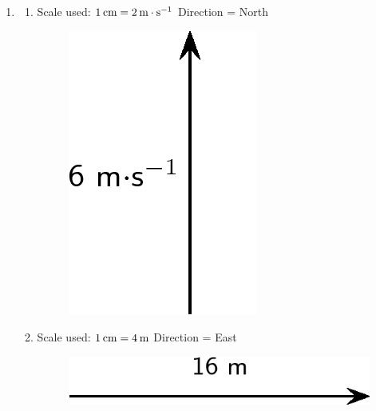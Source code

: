 {\begin{mdframed}[linewidth=4, leftmargin=40, rightmargin=40]
\begin{exercise}
\begin{enumerate}[noitemsep, label=\textbf{Step} \textbf{\arabic*}. ]
\begin{enumerate}[noitemsep, label=\textbf{\alph*}. ]
\label{m38812*uid27}\item If $1\phantom{\rule{2pt}{0ex}}\mathrm{cm}=4\phantom{\rule{2pt}{0ex}}\mathrm{m}$, then $16\phantom{\rule{2pt}{0ex}}\mathrm{m}=4\phantom{\rule{2pt}{0ex}}\mathrm{cm}$
\end{enumerate}
      \item  
      \label{m38812*id188000}\begin{enumerate}[noitemsep, label=\textbf{\alph*}. ] 
            \leftskip=20pt\rightskip=\leftskip\label{m38812*uid28}\item 
Scale used: $1\phantom{\rule{2pt}{0ex}}\mathrm{cm}=2\phantom{\rule{2pt}{0ex}}\mathrm{m}\ensuremath{\cdot}{\mathrm{s}}^{-1}$
Direction = North
    \setcounter{subfigure}{0}
	\begin{figure}[H] %
    \begin{center}
    \label{m38812*id188039!!!underscore!!!media}\label{m38812*id188039!!!underscore!!!printimage}\includegraphics{col11305.imgs/m38812_PG11C1_011.png} %
      \vspace{2pt}
    \vspace{.1in}
    \end{center}
 \end{figure}       \label{m38812*uid29}\item 
Scale used: $1\phantom{\rule{2pt}{0ex}}\mathrm{cm}=4\phantom{\rule{2pt}{0ex}}\mathrm{m}$
Direction = East
    \setcounter{subfigure}{0}
	\begin{figure}[H] %
    \begin{center}
    \label{m38812*id188060!!!underscore!!!media}\label{m38812*id188060!!!underscore!!!printimage}\includegraphics{col11305.imgs/m38812_PG11C1_012.png} %

\end{center}
\end{figure}
\end{enumerate}
\end{enumerate}
\end{exercise}
\end{mdframed}}
